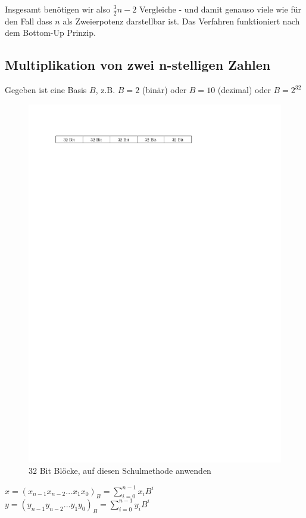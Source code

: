 Insgesamt benötigen wir also $\frac{3}{2}n-2$ Vergleiche - und damit genauso viele wie für den Fall dass $n$ als Zweierpotenz darstellbar ist. Das Verfahren funktioniert nach dem Bottom-Up Prinzip.

\subsection*{Multiplikation von zwei n-stelligen Zahlen}
Gegeben ist eine Basis $B$, z.B. $B=2$ (binär) oder $B=10$ (dezimal) oder $B=2^{32}$\\
\begin{figure}[h]
    \begin{center}
        \includegraphics[width=\textwidth]{../GFX/VL4-32bit-blocks.pdf}
    \caption{32 Bit Blöcke, auf diesen Schulmethode anwenden}
    \end{center}
\end{figure}
$x=(x_{n-1}x_{n-2}...x_1x_0)_B = \sum\limits_{i=0}^{n-1}x_iB^i$\\
$y=(y_{n-1}y_{n-2}...y_1y_0)_B = \sum\limits_{i=0}^{n-1}y_iB^i$\\

